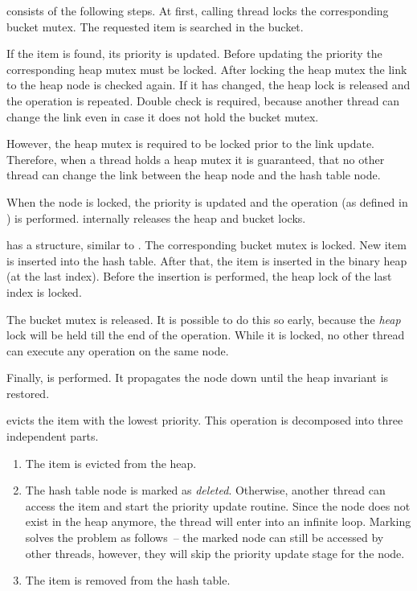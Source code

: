 \begin{block-description}
\item[\findop] consists of the following steps. At first, calling thread locks the corresponding bucket mutex. The requested item is searched in the bucket.

If the item is found, its priority is updated.
Before updating the priority the corresponding heap mutex must be locked.
After locking the heap mutex the link to the heap node is checked again. If it has changed, the heap lock is released and the operation is repeated. Double check is required, because another thread can change the link even in case it does not hold the bucket mutex.

However, the heap mutex is required to be locked prior to the link update. Therefore, when a thread holds a heap mutex it is guaranteed, that no other thread can change the link between the heap node and the hash table node.

When the node is locked, the priority is updated and the  operation (as defined in \cite{champ}) is performed.  internally releases the heap and bucket locks.

\item[\insertop] has a structure, similar to \findop.
The corresponding bucket mutex is locked.
New item is inserted into the hash table. After that, the item is inserted in the binary heap (at the last index). Before the insertion is performed, the heap lock of the last index is locked.

The bucket mutex is released. It is possible to do this so early, because the \emph{heap} lock will be held till the end of the operation. While it is locked, no other thread can execute any operation on the same node.

Finally, \cite{champ} is performed. It propagates the node down until the heap invariant is restored.

 evicts the item with the lowest priority. This operation is decomposed into three independent parts.

\begin{enumerate}
\item The item is evicted from the heap.
\item The hash table node is marked as \emph{deleted}. Otherwise, another thread can access the item and start the priority update routine. Since the node does not exist in the heap anymore, the thread will enter into an infinite loop. Marking solves the problem as follows~-- the marked node can still be accessed by other threads, however, they will skip the priority update stage for the node.
\item The item is removed from the hash table.
\end{enumerate}

\end{block-description}

